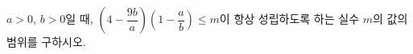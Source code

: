 $a>0$, $b>0$일 때, $\left(4-\dfrac{9b}{a}\right)\left(1-\dfrac{a}{b}\right)\le m$이 항상 성립하도록 하는 실수 $m$의 값의 범위를 구하시오.
